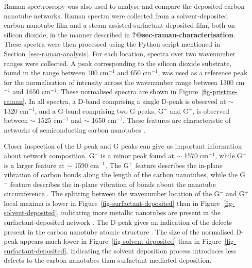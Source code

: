\documentclass[
  a4paper,
]{scrbook}
\begin{document}
Raman spectroscopy was also used to analyse and compare the deposited
carbon nanotube networks. Raman spectra were collected from a
solvent-deposited carbon nanotube film and a steam-assisted
surfactant-deposited film, both on silicon dioxide, in the manner
described in \textbf{?@sec-raman-characterisation}. These spectra were
then processed using the Python script mentioned in
Section~\ref{sec-raman-analysis}. For each location, spectra over two
wavenumber ranges were collected. A peak corresponding to the silicon
dioxide substrate, found in the range between 100 cm\(^{-1}\) and 650
cm\(^{-1}\), was used as a reference peak for the normalisation of
intensity across the wavenumber range between 1300 cm\(^{-1}\) and 1650
cm\(^{-1}\). These normalised spectra are shown in
Figure~\ref{fig-pristine-raman}. In all spectra, a D-band comprising a
single D-peak is observed at \(\sim\) 1320 cm\(^{-1}\), and a G-band
comprising two G-peaks, G\(^-\) and G\(^+\), is observed between
\(\sim\) 1525 cm\(^{-1}\) and \(\sim\) 1650 cm\(^{-1}\). These features
are characteristic of networks of semiconducting carbon nanotubes
\autocite{Dresselhaus2005,King2014}.

Closer inspection of the D peak and G peaks can give us important
information about network composition. G\(^-\) is a minor peak found at
\(\sim\) 1570 cm\(^{-1}\), while G\(^+\) is a larger feature at \(\sim\)
1590 cm\(^{-1}\). The G\(^+\) feature describes the in-plane vibration
of carbon bonds along the length of the carbon nanotubes, while the
G\(^-\) feature describes the in-plane vibration of bonds about the
nanotube circumference \autocite{King2014,Swiniarski2021}. The splitting
between the wavenumber location of the G\(^-\) and G\(^+\) local maxima
is lower in Figure~\ref{fig-surfactant-deposited} than in
Figure~\ref{fig-solvent-deposited}, indicating more metallic nanotubes
are present in the surfactant-deposited network
\autocite{Swiniarski2021}. The D-peak gives an indication of the defects
present in the carbon nanotube atomic structure
\autocite{King2014,Swiniarski2021}. The size of the normalised D-peak
appears much lower in Figure~\ref{fig-solvent-deposited} than in
Figure~\ref{fig-surfactant-deposited}, indicating the solvent deposition
process introduces less defects to the carbon nanotubes than
surfactant-mediated deposition.
\end{document}
